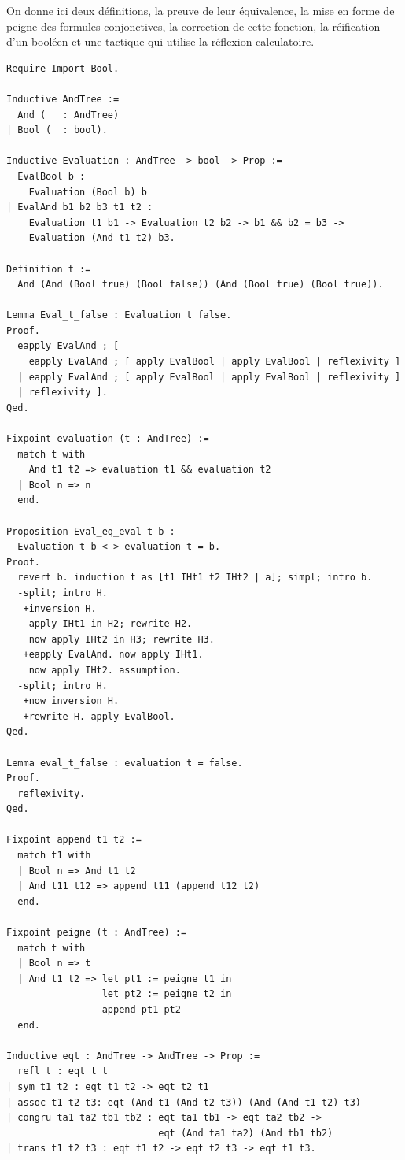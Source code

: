 \documentclass[11pt]{article}
\begin{document}
On donne ici deux définitions, la preuve de leur équivalence, la mise en forme de peigne des formules conjonctives, la correction de cette fonction, la réification d'un booléen et une tactique qui utilise la réflexion calculatoire.

\begin{lstlisting}[frame=single]
Require Import Bool.

Inductive AndTree :=
  And (_ _: AndTree)
| Bool (_ : bool).

Inductive Evaluation : AndTree -> bool -> Prop :=
  EvalBool b :
    Evaluation (Bool b) b
| EvalAnd b1 b2 b3 t1 t2 :
    Evaluation t1 b1 -> Evaluation t2 b2 -> b1 && b2 = b3 ->
    Evaluation (And t1 t2) b3.

Definition t :=
  And (And (Bool true) (Bool false)) (And (Bool true) (Bool true)).

Lemma Eval_t_false : Evaluation t false.
Proof.
  eapply EvalAnd ; [
    eapply EvalAnd ; [ apply EvalBool | apply EvalBool | reflexivity ]
  | eapply EvalAnd ; [ apply EvalBool | apply EvalBool | reflexivity ]
  | reflexivity ].
Qed.

Fixpoint evaluation (t : AndTree) :=
  match t with
    And t1 t2 => evaluation t1 && evaluation t2
  | Bool n => n
  end.

Proposition Eval_eq_eval t b :
  Evaluation t b <-> evaluation t = b.
Proof.  
  revert b. induction t as [t1 IHt1 t2 IHt2 | a]; simpl; intro b.
  -split; intro H.
   +inversion H.
    apply IHt1 in H2; rewrite H2.
    now apply IHt2 in H3; rewrite H3.
   +eapply EvalAnd. now apply IHt1.
    now apply IHt2. assumption.
  -split; intro H.
   +now inversion H.
   +rewrite H. apply EvalBool.
Qed.
   
Lemma eval_t_false : evaluation t = false.
Proof.
  reflexivity.
Qed.

Fixpoint append t1 t2 :=
  match t1 with
  | Bool n => And t1 t2
  | And t11 t12 => append t11 (append t12 t2)
  end. 

Fixpoint peigne (t : AndTree) :=
  match t with
  | Bool n => t
  | And t1 t2 => let pt1 := peigne t1 in
                 let pt2 := peigne t2 in
                 append pt1 pt2
  end.

Inductive eqt : AndTree -> AndTree -> Prop :=
  refl t : eqt t t
| sym t1 t2 : eqt t1 t2 -> eqt t2 t1
| assoc t1 t2 t3: eqt (And t1 (And t2 t3)) (And (And t1 t2) t3)
| congru ta1 ta2 tb1 tb2 : eqt ta1 tb1 -> eqt ta2 tb2 ->
                           eqt (And ta1 ta2) (And tb1 tb2)
| trans t1 t2 t3 : eqt t1 t2 -> eqt t2 t3 -> eqt t1 t3.


\end{lstlisting}
\end{document}
